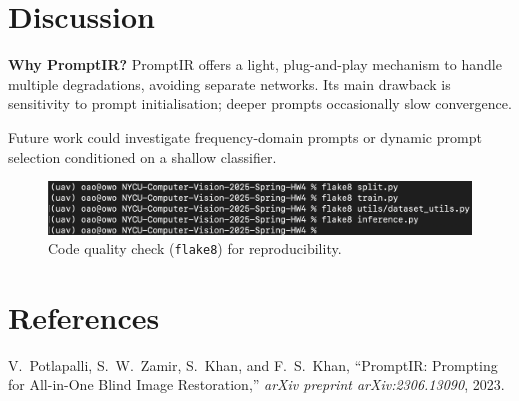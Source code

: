 \documentclass{article}
\begin{document}
\section{Discussion}
\textbf{Why PromptIR?}  PromptIR offers a light, plug-and-play mechanism to handle multiple degradations, avoiding separate networks.  Its main drawback is sensitivity to prompt initialisation; deeper prompts occasionally slow convergence.

Future work could investigate frequency-domain prompts or dynamic prompt selection conditioned on a shallow classifier.

\begin{figure}[H]
\centering
\includegraphics[width=.9\linewidth]{lint_code.png}
\caption{Code quality check (\texttt{flake8}) for reproducibility.}
\end{figure}

\section{References}
\renewcommand{\refname}{}
\begin{thebibliography}{9}
V.~Potlapalli, S.~W.~Zamir, S.~Khan, and F.~S.~Khan, ``PromptIR: Prompting for All-in-One Blind Image Restoration,'' \emph{arXiv preprint arXiv:2306.13090}, 2023.
\end{thebibliography}
\end{document}
